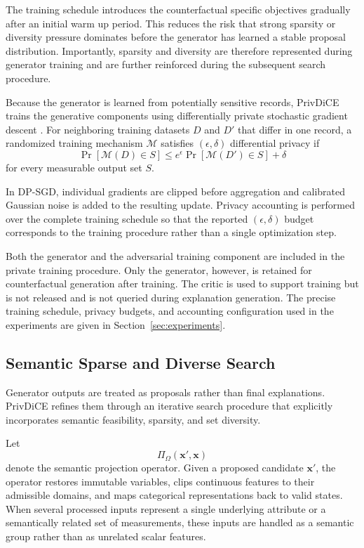 \documentclass[preprint,12pt]{elsarticle}
\begin{document}
The training schedule introduces the counterfactual specific objectives
gradually after an initial warm up period. This reduces the risk that strong
sparsity or diversity pressure dominates before the generator has learned a
stable proposal distribution. Importantly, sparsity and diversity are therefore
represented during generator training and are further reinforced during the
subsequent search procedure.

Because the generator is learned from potentially sensitive records, PrivDiCE
trains the generative components using differentially private stochastic
gradient descent
\cite{abadi2016deep}. For neighboring training datasets $D$ and $D'$ that
differ in one record, a randomized training mechanism $\mathcal{M}$ satisfies
$(\epsilon,\delta)$ differential privacy if
\begin{equation}
\Pr[\mathcal{M}(D)\in S]
\leq
e^{\epsilon}
\Pr[\mathcal{M}(D')\in S]
+
\delta
\label{eq:dp_definition}
\end{equation}
for every measurable output set $S$.

In DP-SGD, individual gradients are clipped before aggregation and calibrated
Gaussian noise is added to the resulting update. Privacy accounting is
performed over the complete training schedule so that the reported
$(\epsilon,\delta)$ budget corresponds to the training procedure rather than a
single optimization step.

Both the generator and the adversarial training component are included in the
private training procedure. Only the generator, however, is retained for
counterfactual generation after training. The critic is used to support
training but is not released and is not queried during explanation generation.
The precise training schedule, privacy budgets, and accounting configuration
used in the experiments are given in Section~\ref{sec:experiments}.


\subsection{Semantic Sparse and Diverse Search}
\label{subsec:sparse_search}

Generator outputs are treated as proposals rather than final explanations.
PrivDiCE refines them through an iterative search procedure that explicitly
incorporates semantic feasibility, sparsity, and set diversity.

Let
\begin{equation}
\Pi_{\Omega}(\mathbf{x}',\mathbf{x})
\end{equation}
denote the semantic projection operator. Given a proposed candidate
$\mathbf{x}'$, the operator restores immutable variables, clips continuous
features to their admissible domains, and maps categorical representations back
to valid states. When several processed inputs represent a single underlying
attribute or a semantically related set of measurements, these inputs are
handled as a semantic group rather than as unrelated scalar features.
\end{document}
